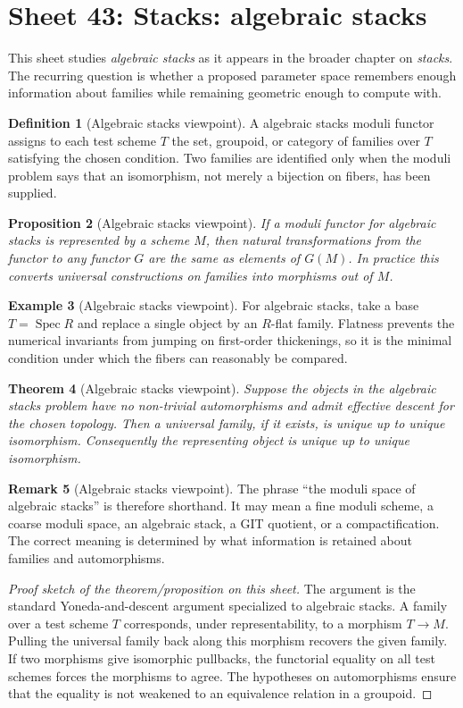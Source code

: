 \documentclass[11pt]{amsart}
\newtheorem{theorem}{Theorem}[section]
\newtheorem{proposition}[theorem]{Proposition}
\theoremstyle{definition}
\newtheorem{definition}[theorem]{Definition}
\newtheorem{example}[theorem]{Example}
\newtheorem{remark}[theorem]{Remark}
\newcommand{\Spec}{\operatorname{Spec}}
\begin{document}
\section{Sheet 43: Stacks: algebraic stacks}
This sheet studies \emph{algebraic stacks} as it appears in the broader chapter on \emph{stacks}.  The recurring question is whether a proposed parameter space remembers enough information about families while remaining geometric enough to compute with.
\begin{definition}[Algebraic stacks viewpoint]
A algebraic stacks moduli functor assigns to each test scheme $T$ the set, groupoid, or category of families over $T$ satisfying the chosen condition.  Two families are identified only when the moduli problem says that an isomorphism, not merely a bijection on fibers, has been supplied.
\end{definition}
\begin{proposition}[Algebraic stacks viewpoint]
If a moduli functor for algebraic stacks is represented by a scheme $M$, then natural transformations from the functor to any functor $G$ are the same as elements of $G(M)$.  In practice this converts universal constructions on families into morphisms out of $M$.
\end{proposition}
\begin{example}[Algebraic stacks viewpoint]
For algebraic stacks, take a base $T=\Spec R$ and replace a single object by an $R$-flat family.  Flatness prevents the numerical invariants from jumping on first-order thickenings, so it is the minimal condition under which the fibers can reasonably be compared.
\end{example}
\begin{theorem}[Algebraic stacks viewpoint]
Suppose the objects in the algebraic stacks problem have no non-trivial automorphisms and admit effective descent for the chosen topology.  Then a universal family, if it exists, is unique up to unique isomorphism.  Consequently the representing object is unique up to unique isomorphism.
\end{theorem}
\begin{remark}[Algebraic stacks viewpoint]
The phrase ``the moduli space of algebraic stacks'' is therefore shorthand.  It may mean a fine moduli scheme, a coarse moduli space, an algebraic stack, a GIT quotient, or a compactification.  The correct meaning is determined by what information is retained about families and automorphisms.
\end{remark}
\begin{proof}[Proof sketch of the theorem/proposition on this sheet]
The argument is the standard Yoneda-and-descent argument specialized to algebraic stacks.  A family over a test scheme $T$ corresponds, under representability, to a morphism $T\to M$.  Pulling the universal family back along this morphism recovers the given family.  If two morphisms give isomorphic pullbacks, the functorial equality on all test schemes forces the morphisms to agree.  The hypotheses on automorphisms ensure that the equality is not weakened to an equivalence relation in a groupoid.
\end{proof}
\end{document}
